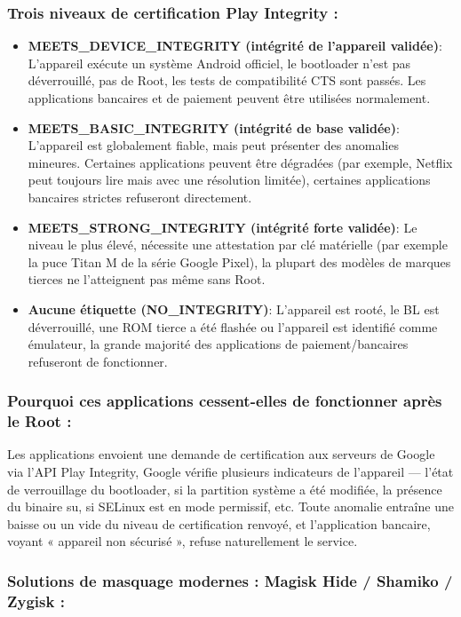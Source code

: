 \subsubsection*{Trois niveaux de certification Play Integrity :}

\begin{itemize}
  \item \textbf{MEETS\_DEVICE\_INTEGRITY (intégrité de l'appareil validée)}: L'appareil exécute un système Android officiel, le bootloader n'est pas déverrouillé, pas de Root, les tests de compatibilité CTS sont passés. Les applications bancaires et de paiement peuvent être utilisées normalement.
  \item \textbf{MEETS\_BASIC\_INTEGRITY (intégrité de base validée)}: L'appareil est globalement fiable, mais peut présenter des anomalies mineures. Certaines applications peuvent être dégradées (par exemple, Netflix peut toujours lire mais avec une résolution limitée), certaines applications bancaires strictes refuseront directement.
  \item \textbf{MEETS\_STRONG\_INTEGRITY (intégrité forte validée)}: Le niveau le plus élevé, nécessite une attestation par clé matérielle (par exemple la puce Titan M de la série Google Pixel), la plupart des modèles de marques tierces ne l'atteignent pas même sans Root.
  \item \textbf{Aucune étiquette (NO\_INTEGRITY)}: L'appareil est rooté, le BL est déverrouillé, une ROM tierce a été flashée ou l'appareil est identifié comme émulateur, la grande majorité des applications de paiement/bancaires refuseront de fonctionner.
\end{itemize}

\subsubsection*{Pourquoi ces applications cessent-elles de fonctionner après le Root :}

Les applications envoient une demande de certification aux serveurs de Google via l'API Play Integrity, Google vérifie plusieurs indicateurs de l'appareil — l'état de verrouillage du bootloader, si la partition système a été modifiée, la présence du binaire su, si SELinux est en mode permissif, etc. Toute anomalie entraîne une baisse ou un vide du niveau de certification renvoyé, et l'application bancaire, voyant « appareil non sécurisé », refuse naturellement le service.

\subsubsection*{Solutions de masquage modernes : Magisk Hide / Shamiko / Zygisk :}

